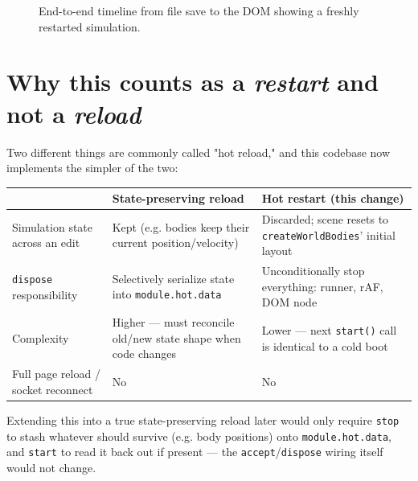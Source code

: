 \documentclass{article}
\begin{document}
\begin{figure}[p]
\caption{End-to-end timeline from file save to the DOM showing a freshly restarted simulation.}
\end{figure}

\section{Why this counts as a \emph{restart} and not a \emph{reload}}

Two different things are commonly called "hot reload," and this codebase
now implements the simpler of the two:

\begin{center}
\begin{tabular}{@{}p{3.6cm}p{5.6cm}p{5.6cm}@{}}
\toprule
 & \textbf{State-preserving reload} & \textbf{Hot restart (this change)} \\
\midrule
Simulation state across an edit & Kept (e.g. bodies keep their current position/velocity) & Discarded; scene resets to \texttt{createWorldBodies}' initial layout \\
\texttt{dispose} responsibility & Selectively serialize state into \texttt{module.hot.data} & Unconditionally stop everything: runner, rAF, DOM node \\
Complexity & Higher --- must reconcile old/new state shape when code changes & Lower --- next \texttt{start()} call is identical to a cold boot \\
Full page reload / socket reconnect & No & No \\
\bottomrule
\end{tabular}
\end{center}

Extending this into a true state-preserving reload later would only
require \texttt{stop} to stash whatever should survive (e.g. body positions)
onto \texttt{module.hot.data}, and \texttt{start} to read it back out if
present --- the \texttt{accept}/\texttt{dispose} wiring itself would not
change.
\end{document}
